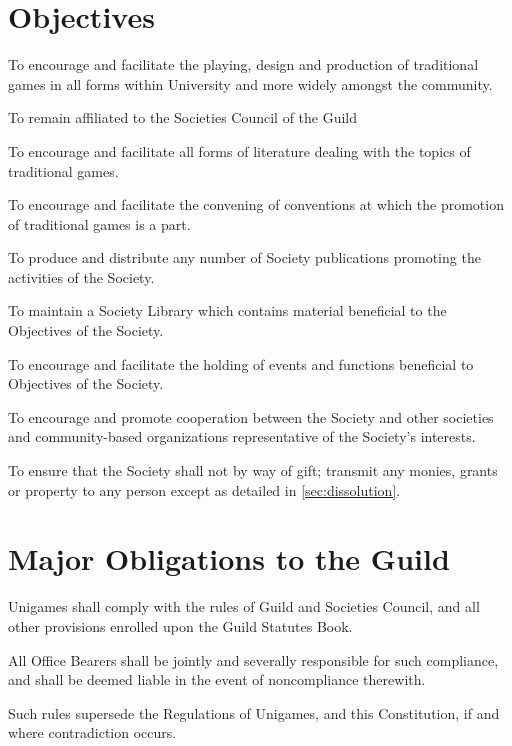 \documentclass[a4paper]{article}
\begin{document}
\section{Objectives} \label{sec:objectives}
\begin{myEnumerate}
    \item To encourage and facilitate the playing, design and production of traditional games in all forms within University and more widely amongst the community.
    \item To remain affiliated to the Societies Council of the Guild
    \item To encourage and facilitate all forms of literature dealing with the topics of traditional games.
    \item To encourage and facilitate the convening of conventions at which the promotion of traditional games is a part.
    \item To produce and distribute any number of Society publications promoting the activities of the Society.
    \item To maintain a Society Library which contains material beneficial to the Objectives of the Society.
    \item To encourage and facilitate the holding of events and functions beneficial to Objectives of the Society.
    \item To encourage and promote cooperation between the Society and other societies and community-based organizations representative of the Society's interests.
    \item To ensure that the Society shall not by way of gift; transmit any monies, grants or property to any person except as detailed in \cref{sec:dissolution}.
\end{myEnumerate}


\section{Major Obligations to the Guild} \label{sec:obligations}
\begin{myEnumerate}
    \item Unigames shall comply with the rules of Guild and Societies Council, and all other provisions enrolled upon the Guild Statutes Book.
        \begin{myEnumerate}
            \item All Office Bearers shall be jointly and severally responsible for such compliance, and shall be deemed liable in the event of noncompliance therewith.
        \end{myEnumerate}
    \item Such rules supersede the Regulations of Unigames, and this Constitution, if and where contradiction occurs.
\end{myEnumerate}
\end{document}
